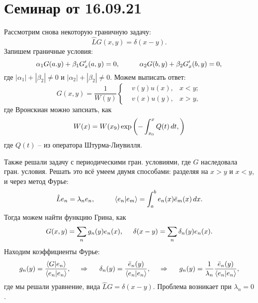 \section{Семинар от 16.09.21}

Рассмотрим снова некоторую граничную задачу:
\begin{equation*}
    \hat{L} G(x, y) = \delta(x-y).
\end{equation*}
Запишем граничные условия:
\begin{equation*}
    \alpha_1 G(a. y) + \beta_1 G'_x(a, y) = 0,
    \hspace{10 mm} 
    \alpha_2 G(b, y) + \beta_2 G'_x (b, y) = 0,
\end{equation*}
где  $|\alpha_1| + |\beta_2| \neq 0$ и $|\alpha_2| + |\beta_2| \neq 0$.
Можем выписать ответ:
\begin{equation*}
    G(x, y) = \frac{1}{W(y)} \left\{\begin{aligned}
        &v(y) u(x), &x < y; \\
        &v(x) u(y), &x > y,
    \end{aligned}\right.
\end{equation*}
где Вронскиан можно запсиать, как
\begin{equation*}
    W(x) = W(x_9) \exp\left(
        - \int_{x_0}^{x}  Q(t) \, d t,
    \right)
\end{equation*}
где $Q(t)$ -- из оператора Штурма-Лиувилля. 

Также решали задачу с периодическими гран. условиями, где $G$ наследовала гран. условия. 
Решать это всё умеем двумя способами: разделяя на $x  > y$ и $x < y$, и через метод Фурье:
\begin{equation*}
    \hat{L} e_n  = \lambda_n e_n,
    \hspace{10 mm} 
    \langle e_n | e_m \rangle = \int_{a}^{b} e_n (x) \bar{e}_m(x)  \d x.
\end{equation*}
Тогда можем найти функцию Грина, как
\begin{equation*}
    G(x, y) = \sum_n g_n (y) e_n (x),
    \hspace{5 mm} 
    \delta(x-y) = \sum_n \delta_n ( y) e_n (x).
\end{equation*}
Находим коэффициенты Фурье:
\begin{equation*}
    g_n (y) = 
    \frac{\langle G | e_n\rangle}{\langle e_n | e_n\rangle},
    \hspace{0.5cm} \Rightarrow \hspace{0.5cm}
    \delta_n (y) = \frac{\bar{e}_n (y)}{\langle e_n | e_n\rangle},
    \hspace{0.5cm} \Rightarrow \hspace{0.5cm}
    g_n (y) = \frac{1}{\lambda_n} \frac{\bar{e}_n (y)}{\langle e_n | e_n\rangle},
\end{equation*}
где мы решали уравнение, вида $\hat{L} G = \delta(x-y)$. 
Проблема возникает при $\lambda_n = 0$. 



